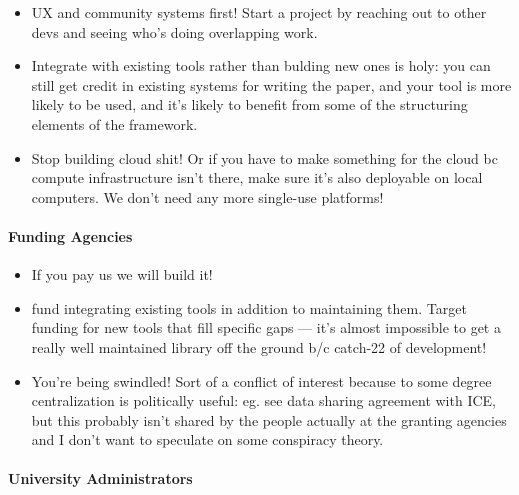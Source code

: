 \documentclass[10pt]{article}
\begin{document}
\begin{multicols}{2}
\begin{itemize}
\item
  UX and community systems first! Start a project by reaching out to
  other devs and seeing who's doing overlapping work.
\item
  Integrate with existing tools rather than bulding new ones is holy:
  you can still get credit in existing systems for writing the paper,
  and your tool is more likely to be used, and it's likely to benefit
  from some of the structuring elements of the framework.
\item
  Stop building cloud shit! Or if you have to make something for the
  cloud bc compute infrastructure isn't there, make sure it's also
  deployable on local computers. We don't need any more single-use
  platforms!
\end{itemize}

\hypertarget{funding-agencies}{%
\paragraph{Funding Agencies}\label{funding-agencies}}

\begin{itemize}

\item
  If you pay us we will build it!
\item
  fund integrating existing tools in addition to maintaining them.
  Target funding for new tools that fill specific gaps --- it's almost
  impossible to get a really well maintained library off the ground b/c
  catch-22 of development!
\item
  You're being swindled! Sort of a conflict of interest because to some
  degree centralization is politically useful: eg. see data sharing
  agreement with ICE, but this probably isn't shared by the people
  actually at the granting agencies and I don't want to speculate on
  some conspiracy theory.
\end{itemize}

\hypertarget{university-administrators}{%
\paragraph{University Administrators}\label{university-administrators}}

\begin{itemize}


\end{itemize}
\end{multicols}
\end{document}
